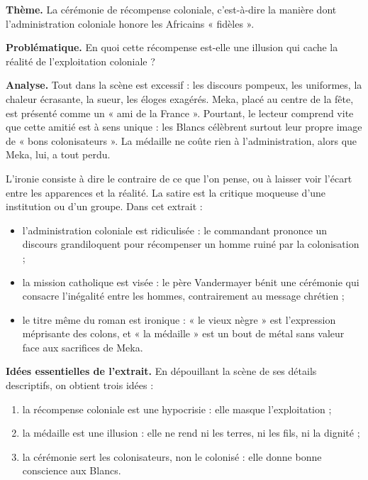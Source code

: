 \documentclass[11pt]{article}
\newcommand{\cle}[1]{{\popxbold\color{popdark}#1}}
\begin{document}
\textbf{Thème.} La cérémonie de récompense coloniale, c'est-à-dire la manière dont l'administration coloniale honore les Africains « fidèles ».

\textbf{Problématique.} En quoi cette récompense est-elle une illusion qui cache la réalité de l'exploitation coloniale ?

\textbf{Analyse.} Tout dans la scène est excessif : les discours pompeux, les uniformes, la chaleur écrasante, la sueur, les éloges exagérés. Meka, placé au centre de la fête, est présenté comme un « ami de la France ». Pourtant, le lecteur comprend vite que cette amitié est à sens unique : les Blancs célèbrent surtout leur propre image de « bons colonisateurs ». La médaille ne coûte rien à l'administration, alors que Meka, lui, a tout perdu.

\begin{exemplebox}
L'\cle{ironie} consiste à dire le contraire de ce que l'on pense, ou à laisser voir l'écart entre les apparences et la réalité. La \cle{satire} est la critique moqueuse d'une institution ou d'un groupe. Dans cet extrait :
\begin{itemize}
\item l'administration coloniale est ridiculisée : le commandant prononce un discours grandiloquent pour récompenser un homme ruiné par la colonisation ;
\item la mission catholique est visée : le père Vandermayer bénit une cérémonie qui consacre l'inégalité entre les hommes, contrairement au message chrétien ;
\item le titre même du roman est ironique : « le vieux nègre » est l'expression méprisante des colons, et « la médaille » est un bout de métal sans valeur face aux sacrifices de Meka.
\end{itemize}
\end{exemplebox}

\textbf{Idées essentielles de l'extrait.} En dépouillant la scène de ses détails descriptifs, on obtient trois idées :
\begin{enumerate}
\item la récompense coloniale est une hypocrisie : elle masque l'exploitation ;
\item la médaille est une illusion : elle ne rend ni les terres, ni les fils, ni la dignité ;
\item la cérémonie sert les colonisateurs, non le colonisé : elle donne bonne conscience aux Blancs.
\end{enumerate}
\end{document}
